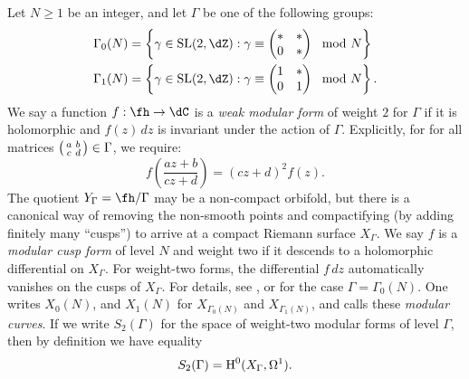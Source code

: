 Let $N\geqslant 1$ be an integer, and let $\Gamma$ be one of the following 
groups:
\begin{align*}
  \Gamma_0(N) &= \left\{\gamma \in \operatorname{SL}(2,\dZ) : \gamma \equiv \begin{pmatrix} \ast & \ast \\ 0 & \ast \end{pmatrix} \mod N\right\} \\
  \Gamma_1(N) &= \left\{\gamma \in \operatorname{SL}(2,\dZ) : \gamma \equiv \begin{pmatrix} 1 & \ast \\ 0 & 1 \end{pmatrix} \mod N\right\} \text{.}
\end{align*}
We say a function $f:\fh\to \dC$ is a \emph{weak modular form} of weight $2$ 
for $\Gamma$ if it is holomorphic and $f(z)\, dz$ is invariant under the action 
of $\Gamma$. Explicitly, for for all matrices $\left(\begin{smallmatrix} a & b \\ c & d \end{smallmatrix} \right)\in\Gamma$, we 
require: 
\[
  f\left(\frac{a z+b}{c z+d}\right) = (c z+d)^2 f(z) \text{.}
\]
The quotient 
$Y_\Gamma=\fh/\Gamma$ may be a non-compact orbifold, but there is a canonical 
way of removing the non-smooth points and compactifying (by adding finitely 
many ``cusps'') to arrive at a compact Riemann surface $X_\Gamma$. 
We say $f$ is a \emph{modular cusp form} of level $N$ and weight two if it descends 
to a holomorphic differential on $X_\Gamma$. For weight-two forms, 
the differential $f\,dz$ automatically vanishes on the cusps of $X_\Gamma$. 
For details, see \cite{ds05}, or \cite[XI.11]{kn92} for the case 
$\Gamma=\Gamma_0(N)$. One writes $X_0(N)$, and $X_1(N)$ for 
$X_{\Gamma_0(N)}$ and $X_{\Gamma_1(N)}$, and calls these \emph{modular curves}. 
If we write $S_2(\Gamma)$ for the space of weight-two modular forms of level 
$\Gamma$, then by definition we have equality
\[
  S_2(\Gamma) = \operatorname{H}^0(X_\Gamma,\Omega^1) \text{.}
\]

